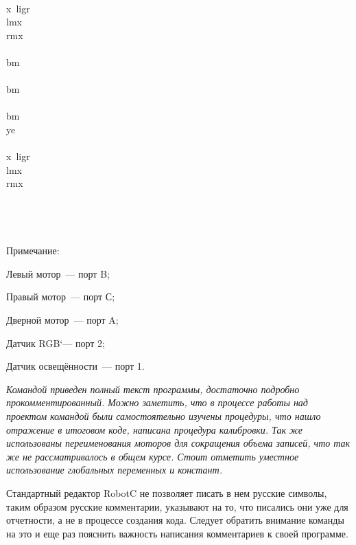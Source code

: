 {	\indent\indent\rC{\{}\\
	\indent\indent\indent x~\rC{=~(\bbC{SensorValue}[}li\rC{] -~}gr\\
	\indent\indent\indent{}\rC{[}lm\rC{] = \rrC{50}~-~}x\rC{;}\\
	\indent\indent\indent{}\rC{[}rm\rC{] = \rrC{50}~+~}x\rC{;}\\
	\indent\indent\rC{\}}\\
	\indent\indent{}\rC{[}bm\rC{] = \rrC{50};}\indent{}\\
	\indent\indent{}\indent{}\\
	\indent\indent{}\rC{[}bm\rC{] = \rrC{-80};}\indent{}\\
	\indent\indent{}\\
	\indent\indent{}\rC{[}bm\rC{] = \rrC{0};}\\
	\indent{}\rC{(\bbC{SensorValue}[}ye\rrC{] == \rrC{YELLOWCOLOR})}\\
	\indent\indent\rC{\{}\\
	\indent\indent\indent x~\rC{=~(\bbC{SensorValue}[}li\rC{] -~}gr\\
	\indent\indent\indent{}\rC{[}lm\rC{] = \rrC{50}~-~}x\rC{;}\\
	\indent\indent\indent{}\rC{[}rm\rC{] = \rrC{50}~+~}x\rC{;}\\
	\indent\indent\rC{\}}\\
	\indent\rC{\}}\\
	\rC{\}}\\
}\\	

\noindent Примечание: 

Левый мотор~--- порт B;

Правый мотор~--- порт С;

Дверной мотор~--- порт A;

Датчик RGB`--- порт 2;

Датчик освещённости~--- порт 1.

{\slshape Командой приведен полный текст программы, достаточно подробно прокомментированный. Можно заметить, что в процессе работы над проектом командой были самостоятельно изучены процедуры, что нашло отражение в итоговом коде, написана процедура калибровки. Так же использованы переименования моторов для сокращения объема записей, что так же не рассматривалось в общем курсе. Стоит отметить уместное использование глобальных переменных и констант.
	
Стандартный редактор RobotC не позволяет писать в нем русские символы, таким образом русские комментарии, указывают на то, что писались они уже для отчетности, а не в процессе создания кода. Следует обратить внимание команды на это и еще раз пояснить важность написания комментариев к своей программе.}
